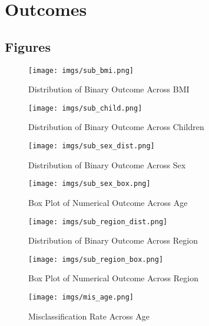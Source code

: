 \documentclass[10pt]{article}
\begin{document}
\FloatBarrier
\newpage
\appendix


\section{Outcomes}
\label{app:4}
\subsection{Figures}
\begin{figure}[h!]
    \centering
    \texttt{[image: imgs/sub\_bmi.png]}
    \caption{Distribution of Binary Outcome Across BMI}
    \label{fig:sub_bmi}
\end{figure}

\begin{figure}[h!]
    \centering
    \texttt{[image: imgs/sub\_child.png]}
    \caption{Distribution of Binary Outcome Across Children}
    \label{fig:sub_child}
\end{figure}

\begin{figure}[h!]
    \centering
    \texttt{[image: imgs/sub\_sex\_dist.png]}
    \caption{Distribution of Binary Outcome Across Sex}
    \label{fig:sub_sex_dist}
\end{figure}

\begin{figure}[h!]
    \centering
    \texttt{[image: imgs/sub\_sex\_box.png]}
    \caption{Box Plot of Numerical Outcome Across Age}
    \label{fig:sub_sex_box}
\end{figure}

\begin{figure}[h!]
    \centering
    \texttt{[image: imgs/sub\_region\_dist.png]}
    \caption{Distribution of Binary Outcome Across Region}
    \label{fig:sub_region_dist}
\end{figure}

\begin{figure}[h!]
    \centering
    \texttt{[image: imgs/sub\_region\_box.png]}
    \caption{Box Plot of Numerical Outcome Across Region}
    \label{fig:sub_region_box}
\end{figure}

\begin{figure}[h!]
    \centering
    \texttt{[image: imgs/mis\_age.png]}
    \caption{Misclassification Rate Across Age}
    \label{fig:mis_age}
\end{figure}
\end{document}
